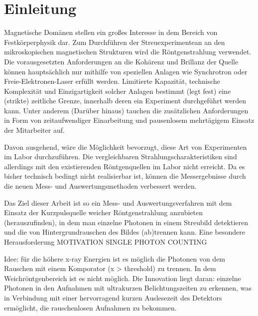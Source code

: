\chapter{Einleitung}
\label{text:einleitung}
Magnetische Domänen stellen ein großes Interesse in dem Bereich von Festkörperphysik dar. Zum Durchführen der Streuexperimentean an den mikroskopischen magnetischen Strukturen wird die Röntgenstrahlung verwendet. Die vorausgesetzten Anforderungen an die Kohärenz und Brillanz der Quelle können hauptsächlich nur mithilfe von speziellen Anlagen wie Synchrotron oder Freie-Elektronen-Laser erfüllt werden. Limitierte Kapazität, technische Komplexität und Einzigartigkeit solcher Anlagen bestimmt (legt fest) eine (strikte) zeitliche Grenze, innerhalb deren ein Experiment durchgeführt werden kann. Unter anderem (Darüber hinaus) tauchen die zusätzlichen Anforderungen in Form von zeitaufwendiger Einarbeitung und pausenlosem mehrtägigem Einsatz der Mitarbeiter auf.

\noindent
Davon ausgehend, wäre die Möglichkeit bevorzugt, diese Art von Experimenten im Labor durchzuführen. Die vergleichbaren Strahlungscharakteristiken  sind allerdings mit den existierenden Röntgenquellen im Labor nicht erreicht. Da es bisher technisch bedingt nicht realisierbar ist, können die Messergebnisse durch die neuen Mess- und Auswertungsmethoden verbessert werden.

\noindent
Das Ziel dieser Arbeit ist so ein Mess- und Auswertungsverfahren mit dem Einsatz der Kurzpulsquelle weicher Röntgenstrahlung anzubieten (herauszufinden), in dem man einzelne Photonen in einem Streubild detektieren und die von Hintergrundrauschen des Bildes (ab)trennen kann. Eine besondere Herausforderung 
MOTIVATION SINGLE PHOTON COUNTING

Idee: für die höhere x-ray Energien ist es möglich die Photonen von dem Rauschen mit einem Komporator (x > threshold) zu trennen. In dem Weichröntgenbereich ist es nicht möglich. Die Innovation liegt daran:  einzelne Photonen in den Aufnahmen mit ultrakurzen Belichtungszeiten zu erkennen, was in Verbindung mit einer hervorragend kurzen Auslesezeit des Detektors ermöglicht, die rauschenlosen Aufnahmen zu bekommen.


